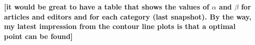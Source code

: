 {\bf [it would be great to have a table that shows the values of $\alpha$ and $\beta$ for articles and editors and for each category (last snapshot). By the way, my latest impression from the contour line plots is that a optimal point can be found]}




%
%
%
%
%
% 
%
%
%
